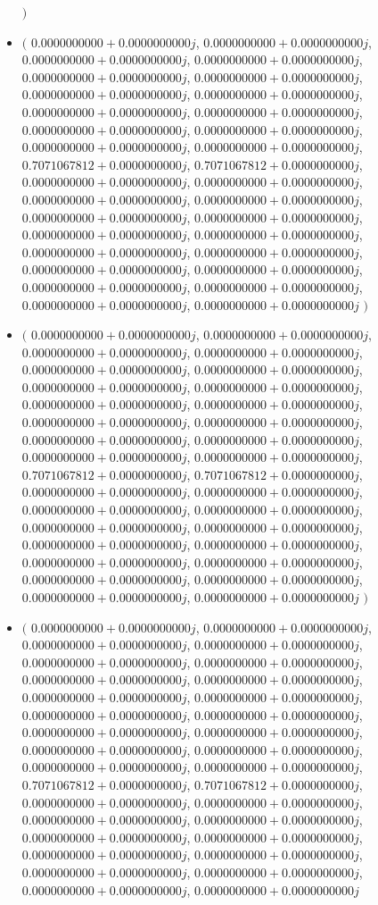 \documentclass[14pt,a4paper]{article}
\begin{document}
\begin{itemize}
$\big)$
\item
$\big($
$0.0000000000+0.0000000000j$, $0.0000000000+0.0000000000j$, $0.0000000000+0.0000000000j$, $0.0000000000+0.0000000000j$, $0.0000000000+0.0000000000j$, $0.0000000000+0.0000000000j$, $0.0000000000+0.0000000000j$, $0.0000000000+0.0000000000j$, $0.0000000000+0.0000000000j$, $0.0000000000+0.0000000000j$, $0.0000000000+0.0000000000j$, $0.0000000000+0.0000000000j$, $0.0000000000+0.0000000000j$, $0.0000000000+0.0000000000j$, $0.7071067812+0.0000000000j$, $0.7071067812+0.0000000000j$, $0.0000000000+0.0000000000j$, $0.0000000000+0.0000000000j$, $0.0000000000+0.0000000000j$, $0.0000000000+0.0000000000j$, $0.0000000000+0.0000000000j$, $0.0000000000+0.0000000000j$, $0.0000000000+0.0000000000j$, $0.0000000000+0.0000000000j$, $0.0000000000+0.0000000000j$, $0.0000000000+0.0000000000j$, $0.0000000000+0.0000000000j$, $0.0000000000+0.0000000000j$, $0.0000000000+0.0000000000j$, $0.0000000000+0.0000000000j$, $0.0000000000+0.0000000000j$, $0.0000000000+0.0000000000j$
$\big)$
\item
$\big($
$0.0000000000+0.0000000000j$, $0.0000000000+0.0000000000j$, $0.0000000000+0.0000000000j$, $0.0000000000+0.0000000000j$, $0.0000000000+0.0000000000j$, $0.0000000000+0.0000000000j$, $0.0000000000+0.0000000000j$, $0.0000000000+0.0000000000j$, $0.0000000000+0.0000000000j$, $0.0000000000+0.0000000000j$, $0.0000000000+0.0000000000j$, $0.0000000000+0.0000000000j$, $0.0000000000+0.0000000000j$, $0.0000000000+0.0000000000j$, $0.0000000000+0.0000000000j$, $0.0000000000+0.0000000000j$, $0.7071067812+0.0000000000j$, $0.7071067812+0.0000000000j$, $0.0000000000+0.0000000000j$, $0.0000000000+0.0000000000j$, $0.0000000000+0.0000000000j$, $0.0000000000+0.0000000000j$, $0.0000000000+0.0000000000j$, $0.0000000000+0.0000000000j$, $0.0000000000+0.0000000000j$, $0.0000000000+0.0000000000j$, $0.0000000000+0.0000000000j$, $0.0000000000+0.0000000000j$, $0.0000000000+0.0000000000j$, $0.0000000000+0.0000000000j$, $0.0000000000+0.0000000000j$, $0.0000000000+0.0000000000j$
$\big)$
\item
$\big($
$0.0000000000+0.0000000000j$, $0.0000000000+0.0000000000j$, $0.0000000000+0.0000000000j$, $0.0000000000+0.0000000000j$, $0.0000000000+0.0000000000j$, $0.0000000000+0.0000000000j$, $0.0000000000+0.0000000000j$, $0.0000000000+0.0000000000j$, $0.0000000000+0.0000000000j$, $0.0000000000+0.0000000000j$, $0.0000000000+0.0000000000j$, $0.0000000000+0.0000000000j$, $0.0000000000+0.0000000000j$, $0.0000000000+0.0000000000j$, $0.0000000000+0.0000000000j$, $0.0000000000+0.0000000000j$, $0.0000000000+0.0000000000j$, $0.0000000000+0.0000000000j$, $0.7071067812+0.0000000000j$, $0.7071067812+0.0000000000j$, $0.0000000000+0.0000000000j$, $0.0000000000+0.0000000000j$, $0.0000000000+0.0000000000j$, $0.0000000000+0.0000000000j$, $0.0000000000+0.0000000000j$, $0.0000000000+0.0000000000j$, $0.0000000000+0.0000000000j$, $0.0000000000+0.0000000000j$, $0.0000000000+0.0000000000j$, $0.0000000000+0.0000000000j$, $0.0000000000+0.0000000000j$, $0.0000000000+0.0000000000j$

\end{itemize}
\end{document}
